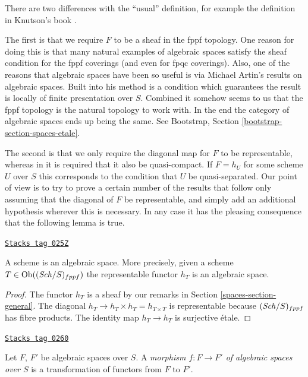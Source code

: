 There are two differences with the ``usual'' definition, for example the
definition in Knutson's book \cite{Kn}.

\medskip\noindent
The first is that we require $F$ to be a sheaf in the fppf topology.
One reason for doing this is that many natural examples
of algebraic spaces satisfy the sheaf condition for the fppf coverings
(and even for fpqc coverings). Also, one of the reasons that algebraic
spaces have been so useful is via Michael Artin's results on algebraic spaces.
Built into his method is a condition which guarantees the result is
locally of finite presentation over $S$.
Combined it somehow seems to us that the fppf topology
is the natural topology to work with. In the end the category
of algebraic spaces ends up being the same. See
Bootstrap, Section \ref{bootstrap-section-spaces-etale}.

\medskip\noindent
The second is that we only require the diagonal map for $F$ to be
representable, whereas in \cite{Kn} it is required that it also
be quasi-compact. If $F = h_U$ for some scheme $U$ over $S$
this corresponds to the condition that $U$ be quasi-separated.
Our point of view is to try to prove a certain
number of the results that follow only assuming that the diagonal
of $F$ be representable, and simply add an additional hypothesis wherever
this is necessary. In any case it has the pleasing consequence that
the following lemma is true.

\begin{lemma}
\label{spaces-lemma-scheme-is-space}
\href{https://stacks.math.columbia.edu/tag/025Z}{\texttt{Stacks tag 025Z}}

A scheme is an algebraic space. More precisely,
given a scheme $T \in \operatorname{Ob}((\mathit{Sch}/S)_{fppf})$
the representable functor $h_T$ is an algebraic space.
\end{lemma}

\begin{proof}
The functor $h_T$ is a sheaf by our remarks in Section \ref{spaces-section-general}.
The diagonal $h_T \to h_T \times h_T = h_{T \times T}$ is
representable because $(\mathit{Sch}/S)_{fppf}$ has fibre products.
The identity map $h_T \to h_T$ is surjective \'etale.
\end{proof}

\begin{definition}
\label{spaces-definition-morphism-algebraic-spaces}
\href{https://stacks.math.columbia.edu/tag/0260}{\texttt{Stacks tag 0260}}

Let $F$, $F'$ be algebraic spaces over $S$.
A {\it morphism $f : F \to F'$ of algebraic spaces over $S$}
is a transformation of functors from $F$ to $F'$.
\end{definition}


